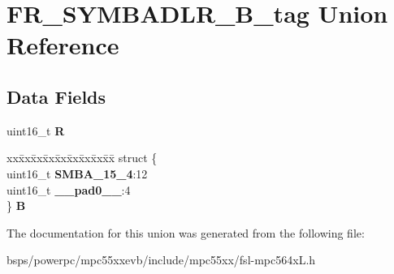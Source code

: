 \hypertarget{unionFR__SYMBADLR__16B__tag}{}\section{F\+R\+\_\+\+S\+Y\+M\+B\+A\+D\+L\+R\+\_\+B\+\_\+tag Union Reference}
\label{unionFR__SYMBADLR__16B__tag}
\subsection*{Data Fields}
\begin{DoxyCompactItemize}
\item 
\mbox{\label{unionFR__SYMBADLR__16B__tag_aa5613d1d2b06755b22ce85a7841c79d0}} 
uint16\+\_\+t {\bfseries R}
\item 
\mbox{\label{unionFR__SYMBADLR__16B__tag_a0af6ec636bc5c802bfefec252bf77daf}} 
\begin{tabbing}
xx\=xx\=xx\=xx\=xx\=xx\=xx\=xx\=xx\=\kill
struct \{\\
\>uint16\_t {\bfseries SMBA\_15\_4}:12\\
\>uint16\_t {\bfseries \_\_pad0\_\_}:4\\
\} {\bfseries B}\\

\end{tabbing}\end{DoxyCompactItemize}


The documentation for this union was generated from the following file\+:\begin{DoxyCompactItemize}
\item 
bsps/powerpc/mpc55xxevb/include/mpc55xx/fsl-\/mpc564x\+L.\+h\end{DoxyCompactItemize}
